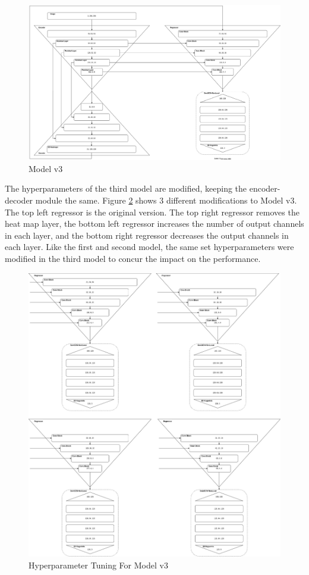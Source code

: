 \begin{figure}[ht]
	\begin{center}
		\includegraphics[width=450px]{assets/Model_v3.jpg}
		\caption{Model v3}
		\label{fig:model_v3}
	\end{center}
\end{figure}

\newpage

\noindent
The hyperparameters of the third model are modified, keeping the encoder-decoder module the same. Figure \ref{fig:model_v3_x} shows 3 different modifications to Model v3. The top left regressor is the original version. The top right regressor removes the heat map layer, the bottom left regressor increases the number of output channels in each layer, and the bottom right regressor decreases the output channels in each layer. Like the first and second model, the same set hyperparameters were modified in the third model to concur the impact on the performance.

\begin{figure}[ht]
	\begin{center}
		\includegraphics[width=450px]{assets/Model_v3.x.jpg}
		\caption{Hyperparameter Tuning For Model v3}
		\label{fig:model_v3_x}
	\end{center}
\end{figure}

